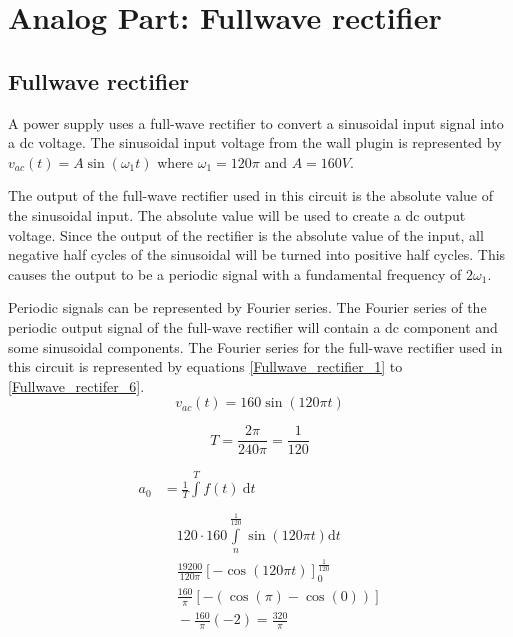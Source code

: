 \section{Analog Part: Fullwave rectifier}
\subsection{Fullwave rectifier}
A power supply uses a full-wave rectifier to convert a sinusoidal input signal into a dc voltage. The sinusoidal input voltage from the wall plugin is represented by $v_{ac}(t) = A\sin({\omega_1t})$ where  $\omega_1 = 120\pi$ and $A = 160V$. \newline\newline

The output of the full-wave rectifier used in this circuit is the absolute value of the sinusoidal input. The absolute value will be used to create a dc output voltage. Since the output of the rectifier is the absolute value of the input, all negative half cycles of the sinusoidal will be turned into positive half cycles. This causes the output to be a periodic signal with a fundamental frequency of $2\omega_1$. \newline

Periodic signals can be represented by Fourier series. The Fourier series of the periodic output signal of the full-wave rectifier will contain a dc component and some sinusoidal components. The Fourier series for the full-wave rectifier used in this circuit is represented by equations \ref{Fullwave_rectifier_1} to \ref{Fullwave_rectifer_6}.
\begin{equation}
    \label{Fullwave_rectifier_1}
    v_{ac}(t) = 160\sin(120\pi t)
\end{equation}

\begin{equation}
    \label{Fullwave_rectifier_T}
    T = \frac{2\pi}{240\pi} = \frac{1}{120}
\end{equation}

\begin{equation}
\label{Fullwave_rectifer_2}
   \begin{split}
a_0 &= \frac{1}{T} \int\limits_{}^{T} f(t)\: \mathrm{d}t \\
  &\quad120 \cdot 160 \int\limits_{n}^{\frac{1}{120}} \sin(120\pi t) \mathrm{d}t\\
  &\quad \frac{19200}{120\pi} [-\cos(120\pi t)]_{0}^{\frac{1}{120}} \\
  &\quad \frac{160}{\pi}[-(\cos(\pi)-\cos(0))]\\
  &\quad - \frac{160}{\pi} (-2) = \frac{320}{\pi}
\end{split} 
\end{equation}

